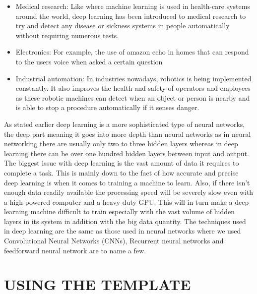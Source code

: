 \documentclass[letterpaper, 10 pt, conference]{ieeeconf}  %
\begin{document}
\begin{itemize}
\item Medical research: Like where machine learning is used in health-care systems around the world, deep learning has been introduced to medical research to try and detect any disease or sickness systems in people automatically without requiring numerous tests.
\end{itemize}

\begin{itemize}
\item Electronics: For example, the use of amazon echo in homes that can respond to the users voice when asked a certain question
\end{itemize}

\begin{itemize}
\item Industrial automation: In industries nowadays, robotics is being implemented constantly. It also improves the health and safety of operators and employees as these robotic machines can detect when an object or person is nearby and is able to stop a procedure automatically if it senses danger.
\end{itemize}

As stated earlier deep learning is a more sophisticated type of neural networks, the deep part meaning it goes into more depth than neural networks as in neural networking there are usually only two to three hidden layers whereas in deep learning there can be over one hundred hidden layers between input and output. 
The biggest issue with deep learning is the vast amount of data it requires to complete a task. This is mainly down to the fact of how accurate and precise deep learning is when it comes to training a machine to learn. Also, if there isn’t enough data readily available the processing speed will be severely slow even with a high-powered computer and a heavy-duty GPU. This will in turn make a deep learning machine difficult to train especially with the vast volume of hidden layers in its system in addition with the big data quantity. The techniques used in deep learning are the same as those used in neural networks where we used Convolutional Neural Networks (CNNs), Recurrent neural networks and feedforward neural network are to name a few. 


\section{USING THE TEMPLATE}
\end{document}
